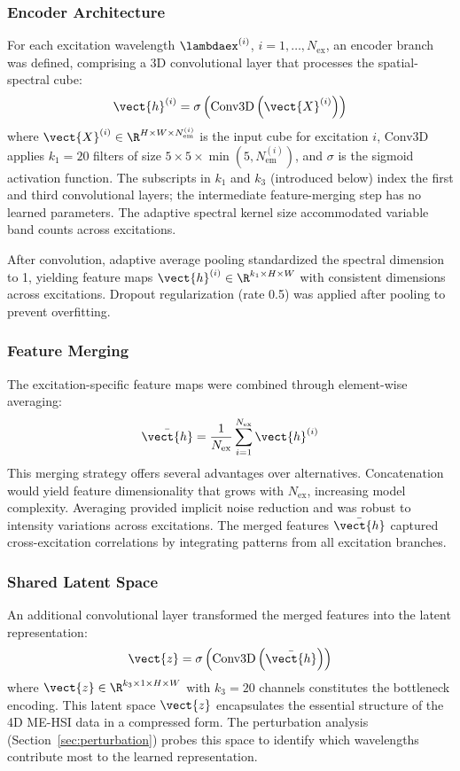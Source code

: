 \subsubsection{Encoder Architecture}
For each excitation wavelength $\lambdaex^{(i)}$, $i = 1, \ldots, N_{\text{ex}}$, an encoder branch was defined, comprising a 3D convolutional layer that processes the spatial-spectral cube:
\begin{equation}
\vect{h}^{(i)} = \sigma\left(\text{Conv3D}\left(\vect{X}^{(i)}\right)\right)
\label{eq:encoder}
\end{equation}
where $\vect{X}^{(i)} \in \R^{H \times W \times N_{\text{em}}^{(i)}}$ is the input cube for excitation $i$, Conv3D applies $k_1 = 20$ filters of size $5 \times 5 \times \min(5, N_{\text{em}}^{(i)})$, and $\sigma$ is the sigmoid activation function.
The subscripts in $k_1$ and $k_3$ (introduced below) index the first and third convolutional layers; the intermediate feature-merging step has no learned parameters.
The adaptive spectral kernel size accommodated variable band counts across excitations.

After convolution, adaptive average pooling standardized the spectral dimension to 1, yielding feature maps $\vect{h}^{(i)} \in \R^{k_1 \times H \times W}$ with consistent dimensions across excitations.
Dropout regularization (rate 0.5) was applied after pooling to prevent overfitting.

\subsubsection{Feature Merging}
The excitation-specific feature maps were combined through element-wise averaging:
\begin{equation}
\bar{\vect{h}} = \frac{1}{N_{\text{ex}}} \sum_{i=1}^{N_{\text{ex}}} \vect{h}^{(i)}
\label{eq:merge}
\end{equation}
This merging strategy offers several advantages over alternatives.
Concatenation would yield feature dimensionality that grows with $N_{\text{ex}}$, increasing model complexity.
Averaging provided implicit noise reduction and was robust to intensity variations across excitations.
The merged features $\bar{\vect{h}}$ captured cross-excitation correlations by integrating patterns from all excitation branches.

\subsubsection{Shared Latent Space}
An additional convolutional layer transformed the merged features into the latent representation:
\begin{equation}
\vect{z} = \sigma\left(\text{Conv3D}\left(\bar{\vect{h}}\right)\right)
\label{eq:latent}
\end{equation}
where $\vect{z} \in \R^{k_3 \times 1 \times H \times W}$ with $k_3 = 20$ channels constitutes the bottleneck encoding.
This latent space $\vect{z}$ encapsulates the essential structure of the 4D ME-HSI data in a compressed form.
The perturbation analysis (Section~\ref{sec:perturbation}) probes this space to identify which wavelengths contribute most to the learned representation.

